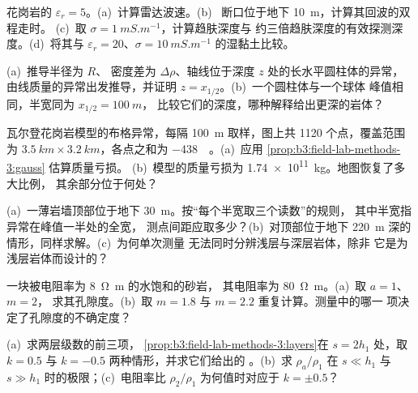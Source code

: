 \begin{exercise}[$\star$]\label{exo:b3:field-lab-methods-3:4}
花岗岩的 $\varepsilon_r = 5$。(a)~计算雷达波速。(b)~
断口位于地下 \qty{10}{m}，计算其回波的双程走时。
(c)~取 $\sigma = \qty{1}{mS.m^{-1}}$，计算趋肤深度与
约三倍趋肤深度的有效探测深度。(d)~将其与
$\varepsilon_r = 20$、$\sigma = \qty{10}{mS.m^{-1}}$ 的湿黏土比较。
\end{exercise}

\begin{exercise}[$\star\star$]\label{exo:b3:field-lab-methods-3:5}
(a)~推导半径为 $R$、
密度差为 $\Delta\rho$、轴线位于深度 $z$ 处的长水平圆柱体的异常，
由线质量的异常出发推导，并证明 $z = x_{1/2}$。(b)~一个圆柱体与一个球体
峰值相同，半宽同为 $x_{1/2} = \qty{100}{m}$，
比较它们的深度，哪种解释给出更深的岩体？
\end{exercise}

\begin{exercise}[$\star\star$]\label{exo:b3:field-lab-methods-3:6}
瓦尔登花岗岩模型的布格异常，每隔
\qty{100}{m} 取样，图上共 \num{1120} 个点，覆盖范围为 $\qty{3.5}{km}
\times \qty{3.2}{km}$，各点之和为 \qty{-438}{\milli\gal}。(a)~应用
\cref{prop:b3:field-lab-methods-3:gauss} 估算质量亏损。
(b)~模型的质量亏损为 \qty{1.74e11}{kg}。地图恢复了多大比例，
其余部分位于何处？
\end{exercise}

\begin{exercise}[$\star\star$]\label{exo:b3:field-lab-methods-3:7}
(a)~一薄岩墙顶部位于地下 \qty{30}{m}。按“每个半宽取三个读数”的规则，
其中半宽指异常在峰值一半处的全宽，
测点间距应取多少？(b)~对顶部位于地下
\qty{220}{m} 深的情形，同样求解。(c)~为何单次测量
无法同时分辨浅层与深层岩体，除非
它是为浅层岩体而设计的？
\end{exercise}

\begin{exercise}[$\star\star$]\label{exo:b3:field-lab-methods-3:8}
一块被电阻率为 \qty{8}{\ohm\metre} 的水饱和的砂岩，
其电阻率为 \qty{80}{\ohm\metre}。(a)~取 $a = 1$、$m = 2$，
求其孔隙度。(b)~取 $m = 1.8$ 与 $m = 2.2$ 重复计算。测量中的哪一
项决定了孔隙度的不确定度？
\end{exercise}

\begin{exercise}[$\star\star$]\label{exo:b3:field-lab-methods-3:9}
(a)~求两层级数的前三项，
\cref{prop:b3:field-lab-methods-3:layers}在 $s = 2h_1$ 处，取 $k =
\num{0.5}$ 与 $k = \num{-0.5}$ 两种情形，并求它们给出的
。(b)~求 $\rho_a/\rho_1$ 在 $s \ll h_1$ 与
$s \gg h_1$ 时的极限；(c)~电阻率比 $\rho_2/\rho_1$ 为何值时对应于
$k = \pm 0.5$？
\end{exercise}


